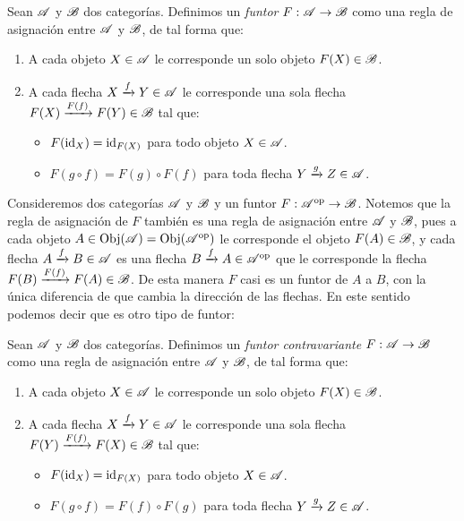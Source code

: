 \documentclass{comunicaciones}
\begin{document}
\begin{dfn}
    Sean $\mathscr A$ y $\mathscr B$ dos categorías. Definimos un \emph{funtor} $F:\mathscr A\to\mathscr B$ como una regla de asignación entre $\mathscr A$ y $\mathscr B$, de tal forma que:
    \begin{enumerate}
        \item A cada objeto $X\in\mathscr A$ le corresponde un solo objeto $F(X)\in\mathscr B$.
        \item A cada flecha $X\xrightarrow{f}Y\in\mathscr A$ le corresponde una sola flecha $F(X)\xrightarrow{F(f)}F(Y)\in\mathscr B$ tal que:
        \begin{itemize}
            \item $F(\mathrm{id}_X)=\mathrm{id}_{F(X)}$ para todo objeto $X\in\mathscr A$.
            \item $F(g\circ f)=F(g)\circ F(f)$ para toda flecha $Y\xrightarrow{g}Z\in\mathscr A$.
        \end{itemize}
    \end{enumerate}
\end{dfn}

Consideremos dos categorías $\mathscr A$ y $\mathscr B$ y un funtor $F:\mathscr A^{\mathrm{op}}\to\mathscr B$. Notemos que la regla de asignación de $F$ también es una regla de asignación entre $\mathscr A$ y $\mathscr B$,
pues a cada objeto $A\in\mathrm{Obj}(\mathscr A)=\mathrm{Obj}(\mathscr A^{\mathrm{op}})$ le corresponde el objeto $F(A)\in\mathscr B$, y cada flecha $A\xrightarrow{f}B\in\mathscr A$ es una flecha $B\xrightarrow{f}A\in\mathscr A^{\mathrm{op}}$ que le corresponde
la flecha $F(B)\xrightarrow{F(f)}F(A)\in\mathscr B$. De esta manera $F$ casi es un funtor de $A$ a $B$, con la única diferencia de que cambia la dirección de las flechas.
En este sentido podemos decir que es otro tipo de funtor:

\begin{dfn}
    Sean $\mathscr A$ y $\mathscr B$ dos categorías. Definimos un \emph{funtor contravariante} $F:\mathscr A\to\mathscr B$ como una regla de asignación entre $\mathscr A$ y $\mathscr B$, de tal forma que:
    \begin{enumerate}
        \item A cada objeto $X\in\mathscr A$ le corresponde un solo objeto $F(X)\in\mathscr B$.
        \item A cada flecha $X\xrightarrow{f}Y\in\mathscr A$ le corresponde una sola flecha $F(Y)\xrightarrow{F(f)}F(X)\in\mathscr B$ tal que:
        \begin{itemize}
            \item $F(\mathrm{id}_X)=\mathrm{id}_{F(X)}$ para todo objeto $X\in\mathscr A$.
            \item $F(g\circ f)=F(f)\circ F(g)$ para toda flecha $Y\xrightarrow{g}Z\in\mathscr A$.
        \end{itemize}
    \end{enumerate}
\end{dfn}
\end{document}
